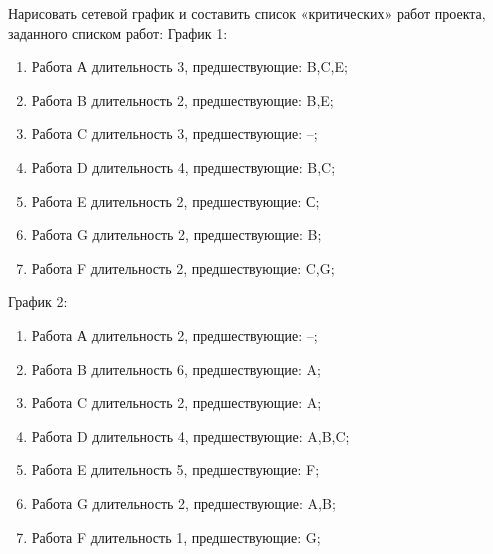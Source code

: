 \question
Нарисовать сетевой график и составить список «критических»
работ проекта, заданного списком работ:
График 1:
\begin{enumerate}
\item  Работа А длительность 3, предшествующие: B,C,E;
\item  Работа B длительность 2, предшествующие: B,E;
\item  Работа C длительность 3, предшествующие: --;
\item  Работа D длительность 4, предшествующие: B,C;
\item  Работа E длительность 2, предшествующие: С;
\item  Работа G длительность 2, предшествующие: B;
\item  Работа F длительность 2, предшествующие: C,G;
\end{enumerate}
График 2:
\begin{enumerate}
\item  Работа А длительность 2, предшествующие: --;
\item  Работа B длительность 6, предшествующие: A;
\item  Работа C длительность 2, предшествующие: A;
\item  Работа D длительность 4, предшествующие: A,B,C;
\item  Работа E длительность 5, предшествующие: F;
\item  Работа G длительность 2, предшествующие: A,B;
\item  Работа F длительность 1, предшествующие: G;
\end{enumerate}